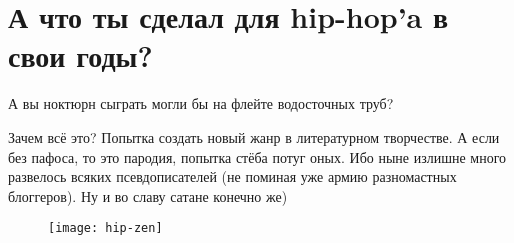 \section*{А что ты сделал для hip-hop'a в свои годы?}\label{section:one}
\begin{epigraph}
    А вы ноктюрн сыграть могли бы на флейте водосточных труб?
\end{epigraph}

Зачем всё это? Попытка создать новый жанр в литературном творчестве.
А если без пафоса, то это пародия, попытка стёба потуг оных. Ибо ныне излишне много развелось всяких псевдописателей (не поминая уже армию разномастных блоггеров).
Ну и во славу сатане конечно же)
\begin{figure}[ht!]
    \centering
    \texttt{[image: hip-zen]}
\end{figure}
